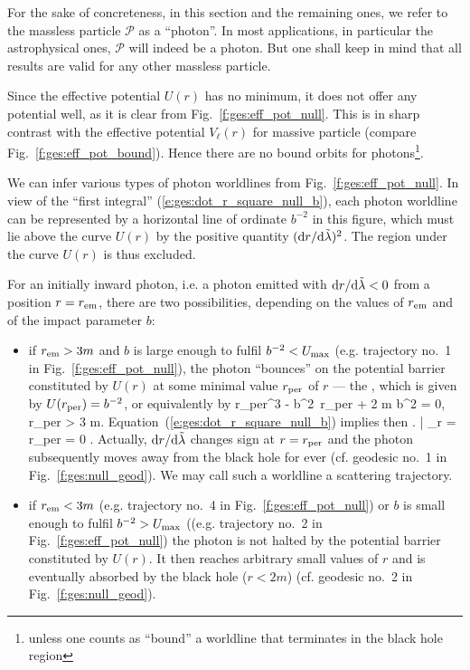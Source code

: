 For the sake of concreteness, in this section and the remaining ones, we
refer to the massless particle $\mathscr{P}$ as a ``photon''. In most applications, in
particular the astrophysical ones, $\mathscr{P}$ will indeed be a photon.
But one shall keep in mind that all results are valid for any other massless
particle.

Since the effective potential
$U(r)$ has no minimum, it does not offer any potential well,
as it is clear from Fig.~\ref{f:ges:eff_pot_null}. This is in sharp contrast
with the effective potential $V_\ell(r)$ for massive particle
(compare Fig.~\ref{f:ges:eff_pot_bound}). Hence there are no bound orbits
for photons\footnote{unless one counts as ``bound'' a worldline that terminates in the
black hole region}.

We can infer various types of photon worldlines from Fig.~\ref{f:ges:eff_pot_null}.
In view of the ``first integral'' (\ref{e:ges:dot_r_square_null_b}),
each photon worldline can be represented by a horizontal line of ordinate
$b^{-2}$ in this figure, which must lie above the curve $U(r)$
by the positive quantity $({\mathrm{d} r}/{\mathrm{d}\tilde{\lambda}})^2$. The region under the curve
$U(r)$ is thus excluded.

For an initially inward photon, i.e. a photon emitted with ${\mathrm{d} r}/{\mathrm{d}\tilde{\lambda}} < 0$
from a position $r=r_{\rm em}$, there are
two possibilities, depending on the values of $r_{\rm em}$ and
of the impact parameter $b$:
\begin{itemize}
\item if $r_{\rm em} > 3 m$ and $b$ is large enough to fulfil $b^{-2} < U_{\rm max}$
(e.g. trajectory no.~1 in Fig.~\ref{f:ges:eff_pot_null}), the photon
``bounces'' on the potential barrier constituted by $U(r)$
at some minimal value  $r_{\rm per}$ of $r$ --- the ,
which is given by  $U(r_{\rm per}) = b^{-2}$, or equivalently by
\be \label{e:ges:r_per_null}
  r_{\rm per}^3 - b^2\, r_{\rm per} + 2 m b^2 = 0, \quad r_{\rm per} > 3 m.
\ee
Equation~(\ref{e:ges:dot_r_square_null_b})
implies then
\be
    \left.  \right| _{r = r_{\rm per}} = 0 .
\ee
Actually, $\mathrm{d} r / \mathrm{d}\tilde{\lambda}$ changes sign at $r = r_{\rm per}$ and
the photon subsequently moves away from the black hole for ever (cf. geodesic
no.~1 in Fig.~\ref{f:ges:null_geod}). We may call
such a worldline a scattering trajectory.
\item if $r_{\rm em} < 3 m$ (e.g. trajectory
no.~4 in Fig.~\ref{f:ges:eff_pot_null}) or $b$ is small enough to fulfil $b^{-2} > U_{\rm max}$ ((e.g. trajectory
no.~2 in Fig.~\ref{f:ges:eff_pot_null}) the photon
is not halted by the potential barrier constituted by $U(r)$. It then reaches arbitrary
small values of $r$ and is eventually absorbed by the black hole ($r < 2m$)
(cf. geodesic no.~2 in Fig.~\ref{f:ges:null_geod}).
\end{itemize}

